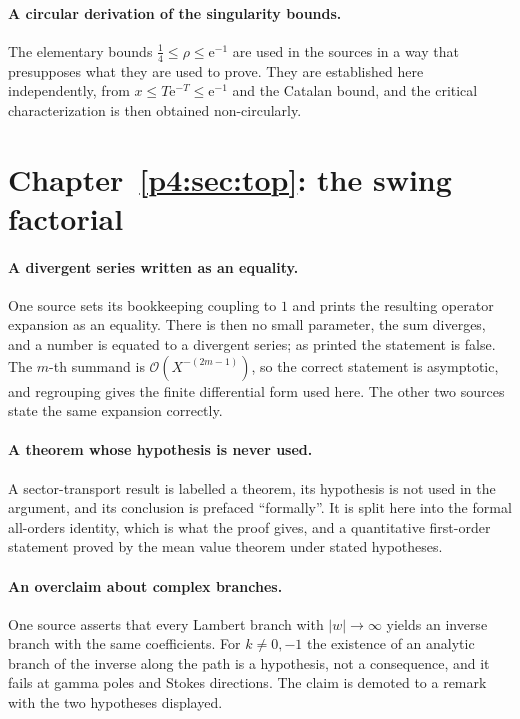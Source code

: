 \documentclass[11pt,a4paper,oneside]{book}
\theoremstyle{plain}
\theoremstyle{definition}
\theoremstyle{remark}
\newcommand{\e}{\mathrm{e}}
\newcommand{\bigO}{\mathcal{O}}
\begin{document}
\paragraph{A circular derivation of the singularity bounds.}
The elementary bounds \(\tfrac14\le\rho\le\e^{-1}\) are used in the sources in
a way that presupposes what they are used to prove.  They are established here
independently, from \(x\le T\e^{-T}\le\e^{-1}\) and the Catalan bound, and the
critical characterization is then obtained non-circularly.

\section{Chapter~\ref{p4:sec:top}: the swing factorial}

\paragraph{A divergent series written as an equality.}
One source sets its bookkeeping coupling to \(1\) and prints the resulting
operator expansion as an equality.  There is then no small parameter, the sum
diverges, and a number is equated to a divergent series; as printed the
statement is false.  The \(m\)-th summand is \(\bigO(X^{-(2m-1)})\), so the
correct statement is asymptotic, and regrouping gives the finite differential
form used here.  The other two sources state the same expansion correctly.

\paragraph{A theorem whose hypothesis is never used.}
A sector-transport result is labelled a theorem, its hypothesis is not used in
the argument, and its conclusion is prefaced ``formally''.  It is split here
into the formal all-orders identity, which is what the proof gives, and a
quantitative first-order statement proved by the mean value theorem under
stated hypotheses.

\paragraph{An overclaim about complex branches.}
One source asserts that every Lambert branch with \(\lvert w\rvert\to\infty\)
yields an inverse branch with the same coefficients.  For \(k\ne0,-1\) the
existence of an analytic branch of the inverse along the path is a hypothesis,
not a consequence, and it fails at gamma poles and Stokes directions.  The
claim is demoted to a remark with the two hypotheses displayed.
\end{document}

